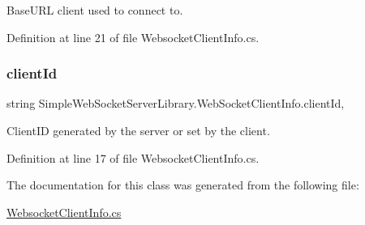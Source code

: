 Base\+U\+RL client used to connect to. 



Definition at line 21 of file Websocket\+Client\+Info.\+cs.

\mbox{\label{class_simple_web_socket_server_library_1_1_web_socket_client_info_acebd7343b1d38251fba57353a82ecf42}} 
\subsubsection{\texorpdfstring{client\+Id}{clientId}}
{\footnotesize\ttfamily string Simple\+Web\+Socket\+Server\+Library.\+Web\+Socket\+Client\+Info.\+client\+Id\hspace{0.3cm}{\ttfamily [get]}, {\ttfamily [set]}}



Client\+ID generated by the server or set by the client. 



Definition at line 17 of file Websocket\+Client\+Info.\+cs.



The documentation for this class was generated from the following file\+:\begin{DoxyCompactItemize}
\item 
\mbox{\hyperlink{_websocket_client_info_8cs}{Websocket\+Client\+Info.\+cs}}\end{DoxyCompactItemize}

